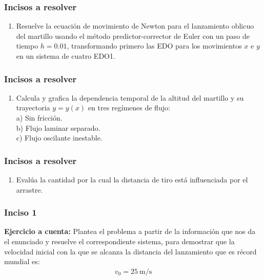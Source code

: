 \documentclass[12pt]{beamer}
\begin{document}
\begin{frame}
\frametitle{Incisos a resolver}
\begin{enumerate}[<+->]
\conti
\item Resuelve la ecuación de movimiento de Newton para el lanzamiento oblicuo del martillo usando el método predictor-corrector de Euler con un paso de tiempo $h = 0.01$, transformando primero las EDO para los movimientos $x$ e $y$ en un sistema de cuatro EDO1.
\seti
\end{enumerate}
\end{frame}
\begin{frame}
\frametitle{Incisos a resolver}
\begin{enumerate}[<+->]
\conti
\item Calcula y grafica la dependencia temporal de la altitud del martillo y su trayectoria $y = y (x)$ en tres regímenes de flujo:
\\
a) Sin fricción. \\
b) Flujo laminar separado. \\
c) Flujo oscilante inestable.
\seti
\end{enumerate}
\end{frame}
\begin{frame}
\frametitle{Incisos a resolver}
\begin{enumerate}[<+->]
\conti
\item Evalúa la cantidad por la cual la distancia de tiro está influenciada por el arrastre.
\end{enumerate}
\end{frame}
\begin{frame}
\frametitle{Inciso 1}
\textbf{Ejercicio a cuenta:} Plantea el problema a partir de la información que nos da el enunciado y resuelve el correspondiente sistema, para demostrar que la velocidad inicial con la que se alcanza la distancia del lanzamiento que es récord mundial es:
\pause
\begin{align*}
v_{0} =  \SI{25}{\meter\per\second}
\end{align*}
\end{frame}
\end{document}
